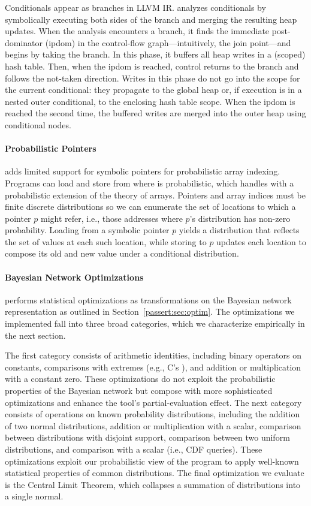 Conditionals appear as branches in LLVM IR.
\tool analyzes conditionals by
symbolically executing both sides of the branch and merging the resulting heap
updates. When the analysis encounters a branch, it finds the immediate post-dominator
(ipdom) in the control-flow graph---intuitively, the join point---and begins by taking
the branch. In this phase, it buffers all heap writes in a (scoped) hash table.
Then, when the ipdom is reached, control returns to the
branch and follows the not-taken direction.
Writes in this phase do not go into the scope for the current conditional:
they propagate to the global heap or, if execution is in a nested outer
conditional, to the enclosing hash table scope.
When the ipdom is reached the second time, the buffered writes are
merged into the outer heap using conditional nodes.

\paragraph{Probabilistic Pointers}

\tool adds limited support for symbolic pointers for probabilistic array
indexing. Programs can load and store from  where  is
probabilistic, which \tool handles with a probabilistic extension of the
theory of
arrays. Pointers and array indices must be finite discrete
distributions so we can enumerate the set of locations to which a pointer $p$
might refer, i.e., those addresses where $p$'s distribution has non-zero
probability.
Loading from a symbolic pointer $p$ yields a distribution that
reflects the set of values at each such location, while storing to
$p$ updates each location to compose its old and new value
under a conditional distribution.

\paragraph{Bayesian Network Optimizations}

\tool performs statistical optimizations as transformations on the Bayesian
network representation as outlined in Section~\ref{passert:sec:optim}. The
optimizations we implemented fall into three broad categories,
which we characterize empirically in the next section.

The first category consists of arithmetic identities, including
binary operators on constants, comparisons with extremes (e.g.,
C's ), and addition or multiplication with a constant zero.
These optimizations do not exploit the probabilistic properties of the
Bayesian network but compose with more sophisticated optimizations and enhance
the tool's partial-evaluation effect.
The next category consists of operations on known probability distributions,
including the addition of two normal distributions, addition or
multiplication with a scalar, comparison between distributions with disjoint
support, comparison between two uniform distributions, and comparison with a
scalar (i.e., CDF queries).
These optimizations exploit our probabilistic view of the program to apply
well-known statistical properties of common distributions.
The final optimization we evaluate is the Central Limit Theorem, which
collapses a summation of distributions into a single normal.

